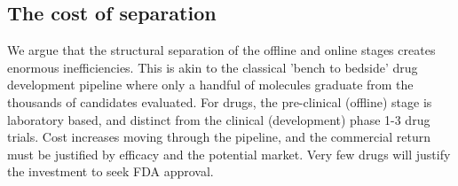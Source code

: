 \documentclass[pmlr,twocolumn,10pt]{jmlr} %
\newtheorem*{note}{Note}
\begin{document}
\subsection{The cost of separation}




We argue that the structural separation of the offline and online stages creates enormous inefficiencies.\citep{vaitla2020a} This is akin to the classical 'bench to bedside' drug development pipeline where only a handful of molecules graduate from the thousands of candidates evaluated. For drugs, the pre-clinical (offline) stage is laboratory based, and distinct from the clinical (development) phase 1-3 drug trials. Cost increases moving through the pipeline, and the commercial return must be justified by efficacy and the potential market. Very few drugs will justify the investment to seek FDA approval. 
\end{document}
